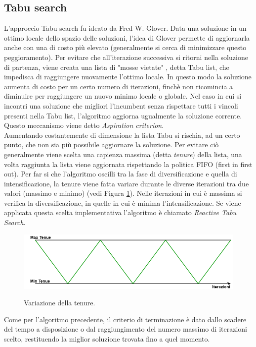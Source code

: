 \subsection{Tabu search \cite{Tabu}}%
L'approccio Tabu search fu ideato da Fred W. Glover. Data una soluzione in un ottimo locale dello spazio delle soluzioni, l'idea di Glover permette di aggiornarla anche con una di costo più elevato (generalmente si cerca di minimizzare questo peggioramento). Per evitare che all'iterazione successiva si ritorni nella soluzione di partenza, viene creata una lista di "mosse vietate" , detta Tabu list, che impedisca di raggiungere nuovamente l'ottimo locale. In questo modo la soluzione aumenta di costo per un certo numero di iterazioni, finchè non ricomincia a diminuire per raggiungere un nuovo minimo locale o globale. Nel caso in cui si incontri una soluzione che migliori l'incumbent senza rispettare tutti i vincoli presenti nella Tabu list, l'algoritmo aggiorna ugualmente la soluzione corrente. Questo meccanismo viene detto \textit{Aspiration criterion}.\\ 
Aumentando costantemente di dimensione la lista Tabu si rischia, ad un certo punto, che non sia più possibile aggiornare la soluzione. Per evitare ciò generalmente viene scelta una capienza massima (detta \textit{tenure}) della lista, una volta raggiunta la lista viene aggiornata rispettando la politica FIFO (first in first out). Per far si che l'algoritmo oscilli tra la fase di diversificazione e quella di intensificazione, la tenure viene fatta variare durante le diverse iterazioni tra due valori (massimo e minimo) (vedi Figura \ref{tenure}). Nelle iterazioni in cui è massima si verifica la diversificazione, in quelle in cui è minima l'intensificazione. Se viene applicata questa scelta implementativa l'algoritmo è chiamato \textit{Reactive Tabu Search}.
 \begin{figure}[H] 
\begin{center} 
  \includegraphics[scale=0.35]{Images/tenure}\\ 
  \caption{\footnotesize{Variazione della tenure.}}
  \label{tenure}
\end{center}
\end{figure}
Come per l'algoritmo precedente, il criterio di terminazione è dato dallo scadere del tempo a disposizione o dal raggiungimento del numero massimo di iterazioni scelto, restituendo la miglior soluzione trovata fino a quel momento.\\
